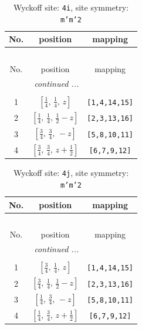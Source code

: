 \documentclass[fleqn,8pt]{jsarticle}
\begin{document}
\renewcommand{\arraystretch}{1.2}
\begin{longtable}{ccc}
\caption{Wyckoff site: {\tt 4i}, site symmetry: {\tt m'm'2}}
 \\
 \hline \hline
No. & position & mapping \\ \hline \endfirsthead

\multicolumn{2}{l}{\tablename\ \thetable{}} \\
 \hline \hline
No. & position & mapping \\ \hline \endhead

 \hline \hline
\multicolumn{2}{r}{\footnotesize\it continued ...} \\ \endfoot

 \hline \hline
\multicolumn{2}{r}{} \\ \endlastfoot

1 & $\left[ \frac{1}{4},\, \frac{1}{4},\, z \right]$ & {\tt [1,4,14,15]} \\ \hline
2 & $\left[ \frac{1}{4},\, \frac{1}{4},\, \frac{1}{2} - z \right]$ & {\tt [2,3,13,16]} \\ \hline
3 & $\left[ \frac{3}{4},\, \frac{3}{4},\, - z \right]$ & {\tt [5,8,10,11]} \\ \hline
4 & $\left[ \frac{3}{4},\, \frac{3}{4},\, z + \frac{1}{2} \right]$ & {\tt [6,7,9,12]} \\
\end{longtable}
\renewcommand{\arraystretch}{1.2}
\begin{longtable}{ccc}
\caption{Wyckoff site: {\tt 4j}, site symmetry: {\tt m'm'2}}
 \\
 \hline \hline
No. & position & mapping \\ \hline \endfirsthead

\multicolumn{2}{l}{\tablename\ \thetable{}} \\
 \hline \hline
No. & position & mapping \\ \hline \endhead

 \hline \hline
\multicolumn{2}{r}{\footnotesize\it continued ...} \\ \endfoot

 \hline \hline
\multicolumn{2}{r}{} \\ \endlastfoot

1 & $\left[ \frac{3}{4},\, \frac{1}{4},\, z \right]$ & {\tt [1,4,14,15]} \\ \hline
2 & $\left[ \frac{3}{4},\, \frac{1}{4},\, \frac{1}{2} - z \right]$ & {\tt [2,3,13,16]} \\ \hline
3 & $\left[ \frac{1}{4},\, \frac{3}{4},\, - z \right]$ & {\tt [5,8,10,11]} \\ \hline
4 & $\left[ \frac{1}{4},\, \frac{3}{4},\, z + \frac{1}{2} \right]$ & {\tt [6,7,9,12]} \\
\end{longtable}
\end{document}
